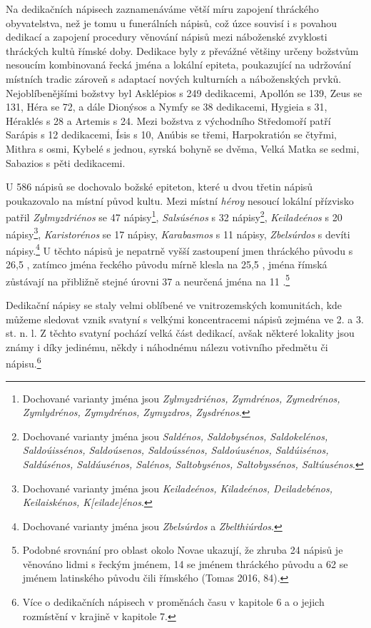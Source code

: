 Na dedikačních nápisech zaznamenáváme větší míru zapojení thráckého obyvatelstva, než je tomu u funerálních nápisů, což úzce souvisí i s povahou dedikací a zapojení procedury věnování nápisů mezi náboženské zvyklosti thráckých kultů římské doby. Dedikace byly z převážné většiny určeny božstvům nesoucím kombinovaná řecká jména a lokální epiteta, poukazující na udržování místních tradic zároveň s adaptací nových kulturních a náboženských prvků. Nejoblíbenějšími božstvy byl Asklépios s 249 dedikacemi, Apollón se 139, Zeus se 131, Héra se 72, a dále Dionýsos a Nymfy se 38 dedikacemi, Hygieia s 31, Héraklés s 28 a Artemis s 24. Mezi božstva z východního Středomoří patří Sarápis s 12 dedikacemi, Ísis s 10, Anúbis se třemi, Harpokratión se čtyřmi, Mithra s osmi, Kybelé s jednou, syrská bohyně se dvěma, Velká Matka se sedmi, Sabazios s pěti dedikacemi.

U 586 nápisů se dochovalo božské epiteton, které u dvou třetin nápisů poukazovalo na místní původ kultu. Mezi místní {\em héroy} nesoucí lokální přízvisko patřil {\em Zylmyzdriénos} se 47 nápisy\footnote{Dochované varianty jména jsou {\em Zylmyzdriénos, Zymdrénos, Zymedrénos, Zymlydrénos, Zymydrénos, Zymyzdros, Zysdrénos}.}, {\em Salsúsénos} s 32 nápisy\footnote{Dochované varianty jména jsou {\em Saldénos, Saldobysénos, Saldokelénos, Saldoúissénos, Saldoúsenos, Saldoússénos, Saldoúusénos, Saldúisénos, Saldúsénos, Saldúusénos, Salénos, Saltobysénos, Saltobyssénos, Saltúusénos}.}, {\em Keiladeénos} s 20 nápisy\footnote{Dochované varianty jména jsou {\em Keiladeénos, Kiladeénos, Deiladebénos, Keilaiskénos, K{[}eilade{]}énos}.}, {\em Karistorénos} se 17 nápisy, {\em Karabasmos} s 11 nápisy, {\em Zbelsúrdos} s devíti nápisy.\footnote{Dochované varianty jména jsou {\em Zbelsúrdos} a {\em Zbelthiúrdos}.} U těchto nápisů je nepatrně vyšší zastoupení jmen thráckého původu s 26,5 , zatímco jména řeckého původu mírně klesla na 25,5 , jména římská zůstávají na přibližně stejné úrovni 37  a neurčená jména na 11 .\footnote{Podobné srovnání pro oblast okolo Novae ukazují, že zhruba 24  nápisů je věnováno lidmi s řeckým jménem, 14  se jménem thráckého původu a 62  se jménem latinského původu čili římského (Tomas 2016, 84).}

Dedikační nápisy se staly velmi oblíbené ve vnitrozemských komunitách, kde můžeme sledovat vznik svatyní s velkými koncentracemi nápisů zejména ve 2. a 3. st. n. l. Z těchto svatyní pochází velká část dedikací, avšak některé lokality jsou známy i díky jedinému, někdy i náhodnému nálezu votivního předmětu či nápisu.\footnote{Více o dedikačních nápisech v proměnách času v kapitole 6 a o jejich rozmístění v krajině v kapitole 7.}


